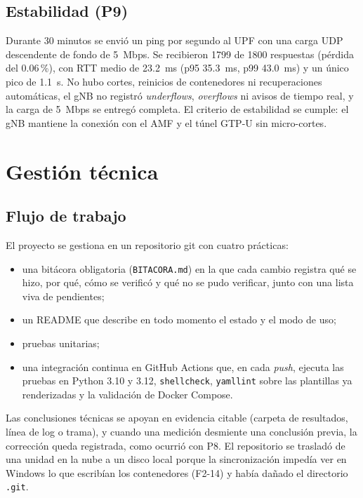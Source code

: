 \documentclass[conference]{IEEEtran}
\begin{document}
\subsection{Estabilidad (P9)}
Durante 30 minutos se envió un ping por segundo al UPF con una carga UDP descendente de fondo de 5~Mbps. Se recibieron 1799 de 1800 respuestas (pérdida del 0.06\,\%), con RTT medio de 23.2~ms (p95 35.3~ms, p99 43.0~ms) y un único pico de 1.1~s. No hubo cortes, reinicios de contenedores ni recuperaciones automáticas, el gNB no registró \textit{underflows}, \textit{overflows} ni avisos de tiempo real, y la carga de 5~Mbps se entregó completa. El criterio de estabilidad se cumple: el gNB mantiene la conexión con el AMF y el túnel GTP-U sin micro-cortes.

\section{Gestión técnica}
\label{sec:gestion}

\subsection{Flujo de trabajo}
El proyecto se gestiona en un repositorio git con cuatro prácticas:
\begin{itemize}
  \item una bitácora obligatoria (\texttt{BITACORA.md}) en la que cada cambio registra qué se hizo, por qué, cómo se verificó y qué no se pudo verificar, junto con una lista viva de pendientes;
  \item un README que describe en todo momento el estado y el modo de uso;
  \item pruebas unitarias;
  \item una integración continua en GitHub Actions que, en cada \textit{push}, ejecuta las pruebas en Python 3.10 y 3.12, \texttt{shellcheck}, \texttt{yamllint} sobre las plantillas ya renderizadas y la validación de Docker Compose.
\end{itemize}
Las conclusiones técnicas se apoyan en evidencia citable (carpeta de resultados, línea de log o trama), y cuando una medición desmiente una conclusión previa, la corrección queda registrada, como ocurrió con P8. El repositorio se trasladó de una unidad en la nube a un disco local porque la sincronización impedía ver en Windows lo que escribían los contenedores (F2-14) y había dañado el directorio \texttt{.git}.
\end{document}
